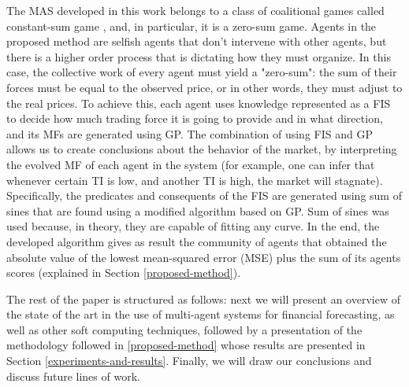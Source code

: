 \documentclass[a4paper,twoside]{article}
\begin{document}
The MAS developed in this work belongs to a class of coalitional games
called constant-sum game \cite{Shoham2009}, and, in particular, it is
a zero-sum game. Agents in the proposed method are selfish agents that
don't intervene with other agents, but there is a higher order process
that is dictating how they must organize. In this case, the collective
work of every agent must yield a "zero-sum": the sum of their forces
must be equal to the observed price, or in other words, they must
adjust to the real prices. To achieve this, each agent uses knowledge 
represented as a FIS to
decide how much trading force it is going to provide and in what
direction, and its MFs are generated using GP. The combination of using
FIS and GP allows us to create conclusions about the behavior of the
market, by interpreting the evolved MF of each agent in the system
(for example, one can infer that whenever certain TI is low, and
another TI is high, the market will stagnate). Specifically, the
predicates and consequents of the FIS are generated using sum of sines
that are found using a modified algorithm based on GP. Sum of sines
was used because, in theory, they are capable of fitting any curve. In
the end, the developed algorithm gives as result the community of
agents that obtained the absolute value of the lowest mean-squared
error (MSE) plus the sum of its agents scores (explained in Section
\ref{proposed-method}). 


The rest of the paper is structured as follows: next we will present
an overview of the state of the art in the use of multi-agent systems
for financial forecasting, as well as other soft computing techniques,
followed by a presentation of the methodology followed in
\ref{proposed-method} whose results are presented in Section
\ref{experiments-and-results}. Finally, we will draw our conclusions
and discuss future lines of work.
\end{document}
